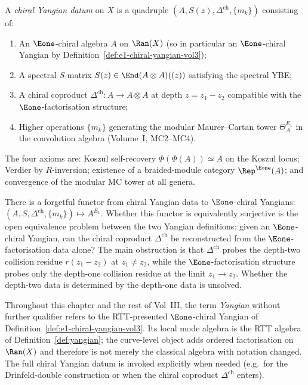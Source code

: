 \begin{definition}
\label{def:chiral-yangian-datum-vol3}
A \emph{chiral Yangian datum} on $X$ is a quadruple
$(A, S(z), \Delta^{\mathrm{ch}}, \{m_k\})$ consisting of:
\begin{enumerate}[label=(\roman*)]
 \item An $\Eone$-chiral algebra $A$ on $\Ran(X)$ (so in
 particular an $\Eone$-chiral Yangian by
 Definition~\ref{def:e1-chiral-yangian-vol3});
 \item A spectral $S$-matrix $S(z) \in \End(A \otimes A)((z))$
 satisfying the spectral YBE;
 \item A chiral coproduct $\Delta^{\mathrm{ch}} \colon A \to
 A \otimes A$ at depth $z = z_1 - z_2$ compatible with the
 $\Eone$-factorisation structure;
 \item Higher operations $\{m_k\}$ generating the modular
 Maurer--Cartan tower $\Theta_A^{E_1}$ in the convolution
 algebra (Volume~I, MC2--MC4).
\end{enumerate}
The four axioms are: Koszul self-recovery
$\Phi(\Phi(A)) \simeq A$ on the Koszul locus; Verdier by
$R$-inversion; existence of a braided-module category
 $\Rep^{\Eone}(A)$; and convergence of the modular MC tower at all
genera.
\end{definition}

\begin{remark}
\label{rem:yangian-forgetful-arrow}
There is a forgetful functor from chiral Yangian data to
$\Eone$-chiral Yangians:
$(A, S, \Delta^{\mathrm{ch}}, \{m_k\}) \mapsto A^{E_1}$. Whether
this functor is equivalently surjective is the open equivalence
problem between the two Yangian definitions: given an $\Eone$-chiral Yangian, can the
chiral coproduct $\Delta^{\mathrm{ch}}$ be reconstructed from the
$\Eone$-factorisation data alone? The main obstruction is that
$\Delta^{\mathrm{ch}}$ probes the depth-two collision residue
$r(z_1 - z_2)$ at $z_1 \neq z_2$, while the $\Eone$-factorisation
structure probes only the depth-one collision residue at the
limit $z_1 \to z_2$. Whether the depth-two data is determined by
the depth-one data is unsolved.
\end{remark}

\begin{remark}
\label{rem:vol3-yangian-convention}
Throughout this chapter and the rest of Vol~III, the term
\emph{Yangian} without further qualifier refers to the
RTT-presented $\Eone$-chiral Yangian of
Definition~\ref{def:e1-chiral-yangian-vol3}. Its local mode algebra is
the RTT algebra of Definition~\ref{def:yangian}; the curve-level object
adds ordered factorisation on~$\Ran(X)$ and therefore is not merely the
classical algebra with notation changed. The full chiral Yangian datum
is invoked explicitly when needed
(e.g.~for the Drinfeld-double construction or when the chiral
coproduct $\Delta^{\mathrm{ch}}$ enters).
\end{remark}


